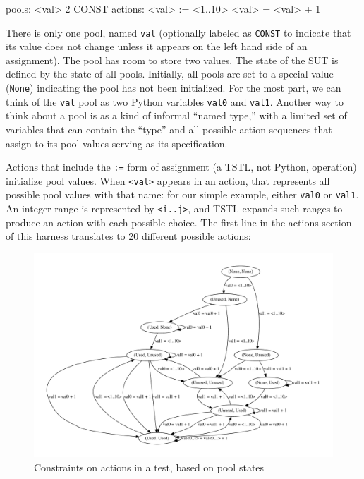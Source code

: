 {\scriptsize
\begin{code}
pools:
  <val> 2 CONST
\vspace{0.05in}
actions:
\vspace{0.05in}
<val> := <1..10>
<val> = <val> + 1
\end{code}
}

There is only one pool, named {\tt val} (optionally labeled as {\tt CONST} to
indicate that its value does not change unless it appears on the left
hand side of an assignment).  The pool has room to store
two values.  The state of the SUT is defined by the state of all
pools.  Initially, all pools are set to a special value ({\tt None}) indicating the
pool has not been initialized.  For the most part, we can think of the
{\tt val} pool as two Python variables {\tt val0} and {\tt val1}.  Another
way to think about a pool is as a kind of informal ``named type,''
with a limited set of variables that can contain the ``type'' and all
possible action sequences that assign to its pool values serving as its specification.

Actions that include the {\tt :=} form of assignment (a TSTL, not
Python, operation) initialize pool values.  When {\tt <val>} appears
in an action, that represents all possible pool values with that
name:  for our simple example, either {\tt val0} or {\tt val1}.  An
integer range is represented by {\tt <i..j>}, and TSTL expands such
ranges to produce an action with each possible choice. The
first line in the actions section of this harness translates to 20
different possible actions:

\begin{figure}
\includegraphics[width=\columnwidth]{states}
\caption{Constraints on actions in a test, based on pool states}
\label{fig:poolacts}
\end{figure}

